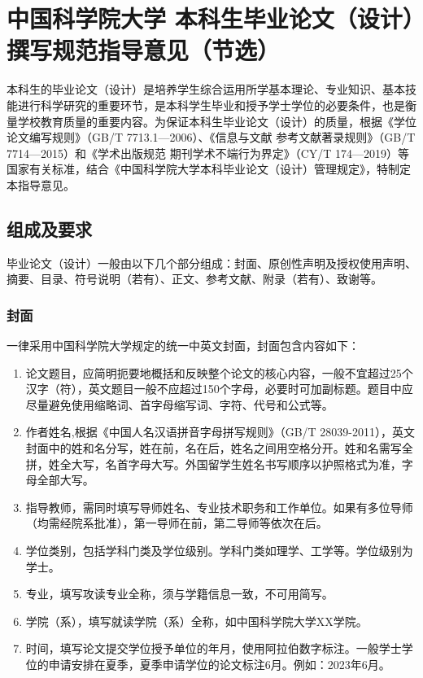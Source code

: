 \chapter{中国科学院大学
本科生毕业论文（设计）撰写规范指导意见（节选）}{
本科生的毕业论文（设计）是培养学生综合运用所学基本理论、专业知识、基本技能进行科学研究的重要环节，是本科学生毕业和授予学士学位的必要条件，也是衡量学校教育质量的重要内容。为保证本科生毕业论文（设计）的质量，根据《学位论文编写规则》（GB/T 7713.1—2006）、《信息与文献 参考文献著录规则》（GB/T 7714—2015）和《学术出版规范 期刊学术不端行为界定》（CY/T 174—2019）等国家有关标准，结合《中国科学院大学本科毕业论文（设计）管理规定》，特制定本指导意见。

\section{组成及要求}
毕业论文（设计）一般由以下几个部分组成：封面、原创性声明及授权使用声明、摘要、目录、符号说明（若有）、正文、参考文献、附录（若有）、致谢等。
\subsection{封面}
一律采用中国科学院大学规定的统一中英文封面，封面包含内容如下：

\begin{enumerate}
    \item 论文题目，应简明扼要地概括和反映整个论文的核心内容，一般不宜超过25个汉字（符），英文题目一般不应超过150个字母，必要时可加副标题。题目中应尽量避免使用缩略词、首字母缩写词、字符、代号和公式等。
    \item 作者姓名,根据《中国人名汉语拼音字母拼写规则》（GB/T 28039-2011），英文封面中的姓和名分写，姓在前，名在后，姓名之间用空格分开。姓和名需写全拼，姓全大写，名首字母大写。外国留学生姓名书写顺序以护照格式为准，字母全部大写。
    \item 指导教师，需同时填写导师姓名、专业技术职务和工作单位。如果有多位导师（均需经院系批准），第一导师在前，第二导师等依次在后。
    \item 学位类别，包括学科门类及学位级别。学科门类如理学、工学等。学位级别为学士。
    \item 专业，填写攻读专业全称，须与学籍信息一致，不可用简写。
    \item 学院（系），填写就读学院（系）全称，如中国科学院大学XX学院。
    \item 时间，填写论文提交学位授予单位的年月，使用阿拉伯数字标注。一般学士学位的申请安排在夏季，夏季申请学位的论文标注6月。例如：2023年6月。
\end{enumerate}

}
